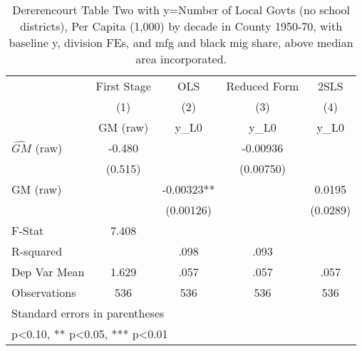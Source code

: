 \begin{table}[htbp]\centering
\def\sym#1{\ifmmode^{#1}\else\(^{#1}\)\fi}
\caption{Dererencourt Table Two with y=Number of Local Govts (no school districts), Per Capita (1,000) by decade in County 1950-70, with baseline y, division FEs, and mfg and black mig share, above median area incorporated.}
\begin{tabular}{l*{4}{c}}
\toprule
                    & First Stage   &         OLS   &Reduced Form   &        2SLS   \\
                    &\multicolumn{1}{c}{(1)}&\multicolumn{1}{c}{(2)}&\multicolumn{1}{c}{(3)}&\multicolumn{1}{c}{(4)}\\
                    &\multicolumn{1}{c}{GM  (raw)}&\multicolumn{1}{c}{y\_L0}&\multicolumn{1}{c}{y\_L0}&\multicolumn{1}{c}{y\_L0}\\
\midrule
$\hat{GM}$ (raw)    &      -0.480   &               &    -0.00936   &               \\
                    &     (0.515)   &               &   (0.00750)   &               \\
\addlinespace
GM  (raw)           &               &    -0.00323** &               &      0.0195   \\
                    &               &   (0.00126)   &               &    (0.0289)   \\
\midrule
F-Stat              &       7.408   &               &               &               \\
R-squared           &               &        .098   &        .093   &               \\
Dep Var Mean        &       1.629   &        .057   &        .057   &        .057   \\
Observations        &         536   &         536   &         536   &         536   \\
\bottomrule
\multicolumn{5}{l}{\footnotesize Standard errors in parentheses}\\
\multicolumn{5}{l}{\footnotesize * p<0.10, ** p<0.05, *** p<0.01}\\
\end{tabular}
\end{table}
